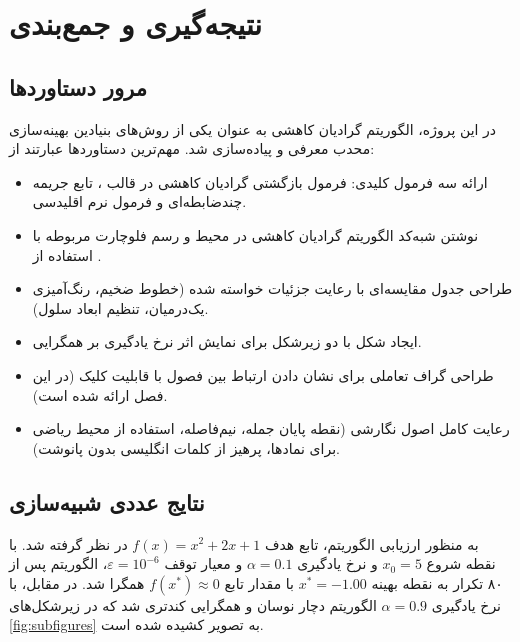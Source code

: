 \chapter{نتیجه‌گیری و جمع‌بندی}
\section{مرور دستاوردها}
در این پروژه، الگوریتم گرادیان کاهشی به عنوان یکی از روش‌های بنیادین بهینه‌سازی محدب معرفی و پیاده‌سازی شد. مهم‌ترین دستاوردها عبارتند از:
\begin{itemize}
	\item ارائه سه فرمول کلیدی: فرمول بازگشتی گرادیان کاهشی در قالب ، تابع جریمه چندضابطه‌ای و فرمول نرم اقلیدسی.
	\item نوشتن شبه‌کد الگوریتم گرادیان کاهشی در محیط  و رسم فلوچارت مربوطه با استفاده از .
	\item طراحی جدول مقایسه‌ای با رعایت جزئیات خواسته شده (خطوط ضخیم، رنگ‌آمیزی یک‌درمیان، تنظیم ابعاد سلول).
	\item ایجاد شکل با دو زیرشکل برای نمایش اثر نرخ یادگیری بر همگرایی.
	\item طراحی گراف تعاملی برای نشان دادن ارتباط بین فصول با قابلیت کلیک (در این فصل ارائه شده است).
	\item رعایت کامل اصول نگارشی (نقطه پایان جمله، نیم‌فاصله، استفاده از محیط ریاضی برای نمادها، پرهیز از کلمات انگلیسی بدون پانوشت).
\end{itemize}

\section{نتایج عددی شبیه‌سازی}
به منظور ارزیابی الگوریتم، تابع هدف \( f(x) = x^2 + 2x + 1 \) در نظر گرفته شد. با نقطه شروع \( x_0 = 5 \) و نرخ یادگیری \( \alpha = 0.1 \) و معیار توقف \( \varepsilon = 10^{-6} \)، الگوریتم پس از ۸۰ تکرار به نقطه بهینه \( x^* = -1.00 \) با مقدار تابع \( f(x^*) \approx 0 \) همگرا شد. در مقابل، با نرخ یادگیری \( \alpha = 0.9 \) الگوریتم دچار نوسان و همگرایی کندتری شد که در زیرشکل‌های \cref{fig:subfigures} به تصویر کشیده شده است.

